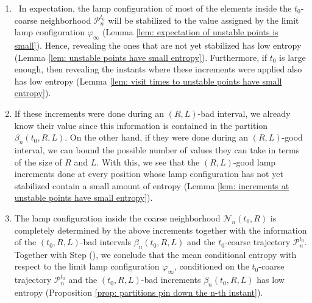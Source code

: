 \documentclass[reqno,oneside,11pt]{amsart}
\theoremstyle{plain}
\theoremstyle{definition}
\begin{document}
\begin{enumerate}
	\item \label{step: step 8} In expectation, the lamp configuration of most of the elements inside the $t_0$-coarse neighborhood $\mathcal{P}_n^{t_0}$ will be stabilized to the value assigned by the limit lamp configuration $\varphi_{\infty}$ (Lemma \ref{lem: expectation of unstable points is small}). Hence, revealing the ones that are not yet stabilized has low entropy (Lemma \ref{lem: unstable points have small entropy}). Furthermore, if $t_0$ is large enough, then revealing the instants where these increments were applied also has low entropy (Lemma \ref{lem: visit times to unstable points have small entropy}).
	
	\item \label{step: step 9} If these increments were done during an $(R,L)$-bad interval, we already know their value since this information is contained in the partition $\beta_n(t_0,R,L)$. On the other hand, if they were done during an $(R,L)$-good interval, we can bound the possible number of values they can take in terms of the size of $R$ and $L$. With this, we see that the $(R,L)$-good lamp increments done at every position whose lamp configuration has not yet stabilized contain a small amount of entropy (Lemma \ref{lem: increments at unstable points have small entropy}).
	
	\item \label{step: step 10} The lamp configuration inside the coarse neighborhood $\mathcal{N}_n(t_0,R)$ is completely determined by the above increments together with the information of the $(t_0,R,L)$-bad intervals $\beta_n(t_0,R,L)$ and the $t_0$-coarse trajectory $\mathcal{P}_n^{t_0}$. Together with Step (), we conclude that the mean conditional entropy with respect to the limit lamp configuration $\varphi_{\infty}$, conditioned on the $t_0$-coarse trajectory $\mathcal{P}_n^{t_0}$ and the $(t_0,R,L)$-bad increments $\beta_n(t_0,R,L)$ has low entropy (Proposition \ref{prop: partitions pin down the n-th instant}).
\end{enumerate}

\end{document}
